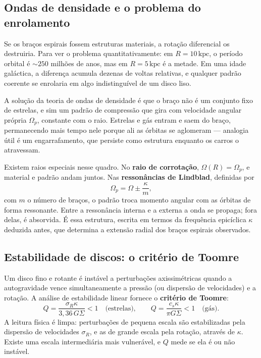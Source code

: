 \documentclass[11pt,a4paper]{article}
\begin{document}
\subsection*{Ondas de densidade e o problema do enrolamento}

Se os braços espirais fossem estruturas materiais, a rotação diferencial os destruiria. Para ver o problema quantitativamente: em $R=10\,\mathrm{kpc}$, o período orbital é $\sim250$ milhões de anos, mas em $R=5\,\mathrm{kpc}$ é a metade. Em uma idade galáctica, a diferença acumula dezenas de voltas relativas, e qualquer padrão coerente se enrolaria em algo indistinguível de um disco liso.

A solução da teoria de ondas de densidade é que o braço não é um conjunto fixo de estrelas, e sim um padrão de compressão que gira com velocidade angular própria $\Omega_p$, constante com o raio. Estrelas e gás entram e saem do braço, permanecendo mais tempo nele porque ali as órbitas se aglomeram --- analogia útil é um engarrafamento, que persiste como estrutura enquanto os carros o atravessam.

Existem raios especiais nesse quadro. No \textbf{raio de corrotação}, $\Omega(R)=\Omega_p$, e material e padrão andam juntos. Nas \textbf{ressonâncias de Lindblad}, definidas por
\[
\Omega_p=\Omega\pm\frac{\kappa}{m},
\]
com $m$ o número de braços, o padrão troca momento angular com as órbitas de forma ressonante. Entre a ressonância interna e a externa a onda se propaga; fora delas, é absorvida. É essa estrutura, escrita em termos da frequência epicíclica $\kappa$ deduzida antes, que determina a extensão radial dos braços espirais observados.

\subsection*{Estabilidade de discos: o critério de Toomre}

Um disco fino e rotante é instável a perturbações axissimétricas quando a autogravidade vence simultaneamente a pressão (ou dispersão de velocidades) e a rotação. A análise de estabilidade linear fornece o \textbf{critério de Toomre}:
\[
Q=\frac{\sigma_R\kappa}{3{,}36\,G\Sigma}<1
\quad\text{(estrelas)},
\qquad
Q=\frac{c_s\kappa}{\pi G\Sigma}<1
\quad\text{(gás)}.
\]
A leitura física é limpa: perturbações de pequena escala são estabilizadas pela dispersão de velocidades $\sigma_R$, e as de grande escala pela rotação, através de $\kappa$. Existe uma escala intermediária mais vulnerável, e $Q$ mede se ela é ou não instável.
\end{document}
